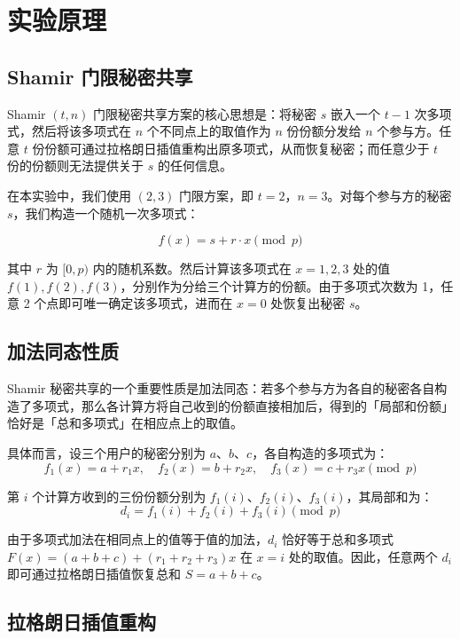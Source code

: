 \documentclass[UTF8,a4paper,10pt]{ctexart}
\begin{document}
\section{实验原理}

\subsection{Shamir 门限秘密共享}

Shamir $(t,n)$ 门限秘密共享方案的核心思想是：将秘密 $s$ 嵌入一个 $t-1$ 次多项式，然后将该多项式在 $n$ 个不同点上的取值作为 $n$ 份份额分发给 $n$ 个参与方。任意 $t$ 份份额可通过拉格朗日插值重构出原多项式，从而恢复秘密；而任意少于 $t$ 份的份额则无法提供关于 $s$ 的任何信息。

在本实验中，我们使用 $(2,3)$ 门限方案，即 $t=2$，$n=3$。对每个参与方的秘密 $s$，我们构造一个随机一次多项式：

\[
f(x) = s + r \cdot x \pmod{p}
\]

其中 $r$ 为 $[0, p)$ 内的随机系数。然后计算该多项式在 $x=1,2,3$ 处的值 $f(1), f(2), f(3)$，分别作为分给三个计算方的份额。由于多项式次数为 1，任意 2 个点即可唯一确定该多项式，进而在 $x=0$ 处恢复出秘密 $s$。

\subsection{加法同态性质}

Shamir 秘密共享的一个重要性质是加法同态：若多个参与方为各自的秘密各自构造了多项式，那么各计算方将自己收到的份额直接相加后，得到的「局部和份额」恰好是「总和多项式」在相应点上的取值。

具体而言，设三个用户的秘密分别为 $a$、$b$、$c$，各自构造的多项式为：
\[
f_1(x)=a+r_1x,\quad f_2(x)=b+r_2x,\quad f_3(x)=c+r_3x \pmod{p}
\]

第 $i$ 个计算方收到的三份份额分别为 $f_1(i)$、$f_2(i)$、$f_3(i)$，其局部和为：
\[
d_i = f_1(i) + f_2(i) + f_3(i) \pmod{p}
\]

由于多项式加法在相同点上的值等于值的加法，$d_i$ 恰好等于总和多项式 $F(x)=(a+b+c)+(r_1+r_2+r_3)x$ 在 $x=i$ 处的取值。因此，任意两个 $d_i$ 即可通过拉格朗日插值恢复总和 $S=a+b+c$。

\subsection{拉格朗日插值重构}
\end{document}
